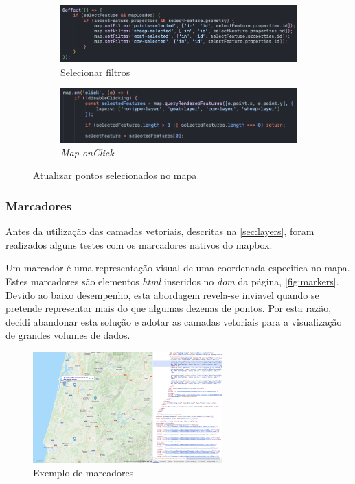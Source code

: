 \begin{figure}[!h]
	\centering
	\begin{subfigure}[c]{0.45\textwidth}
		\centering
		\includegraphics[width=\textwidth]{figs/setfilter.png}
		\caption{Selecionar filtros}
		\label{fig:updateMapSelected}
	\end{subfigure}
	\hfill
	\begin{subfigure}[c]{0.45\textwidth}
		\centering
		\includegraphics[width=\textwidth]{figs/mapClick.png}
		\caption{\textit{Map onClick}}
		\label{fig:mapClick}
	\end{subfigure}
	\caption{Atualizar pontos selecionados no mapa}
    \label{fig:mapLayersUpdate}
\end{figure}

\subsubsection{\textbf{Marcadores}}\label{sec:markers}
Antes da utilização das camadas vetoriais, descritas na \ref{sec:layers}, foram realizados alguns testes com os marcadores nativos do mapbox. 

Um marcador é uma representação visual de uma coordenada especifica no mapa. Estes marcadores são elementos \textit{html} inseridos no \textit{\acs{dom}} da página, \autoref{fig:markers}. Devido ao baixo desempenho, esta abordagem revela-se inviavel quando se pretende representar mais do que algumas dezenas de pontos. Por esta razão, decidi abandonar esta solução e adotar as camadas vetoriais para a visualização de grandes volumes de dados.

\begin{figure}[h!]
    \centering
    \includegraphics[width=0.65\textwidth]{figs/markers.png}
    \caption{Exemplo de marcadores}
    \label{fig:markers}
\end{figure}


